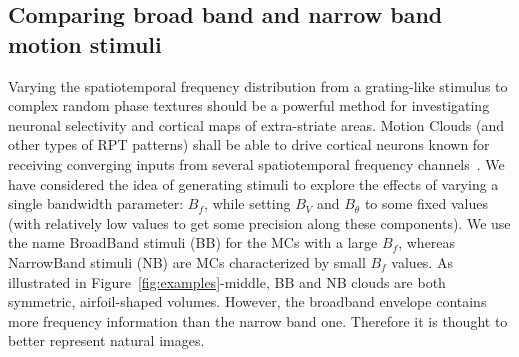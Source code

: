 \documentclass[a4paper,11pt]{article}%
\begin{document}
\subsection{Comparing broad band and narrow band motion stimuli}%

Varying the spatiotemporal frequency distribution from a grating-like stimulus to complex random phase textures should be a powerful method for investigating neuronal selectivity and cortical maps of extra-striate areas. Motion Clouds (and other types of RPT patterns) shall be able to drive cortical neurons known for receiving converging inputs from several spatiotemporal frequency channels~\citep{Rust05}. We have considered the idea of generating stimuli to explore the effects of varying a single bandwidth parameter: $B_{f}$, while setting $B_{V}$ and $B_{\theta}$ to some fixed values (with relatively low values to get some precision along these components). We use the name BroadBand stimuli (BB) for the MCs with a large $B_{f}$, whereas NarrowBand stimuli (NB) are MCs characterized by small $B_{f}$ values. As illustrated in Figure~\ref{fig:examples}-middle, BB and NB clouds are both symmetric, airfoil-shaped volumes. However, the broadband envelope contains more frequency information than the narrow band one. Therefore it is thought to better represent natural images. %
\end{document}
